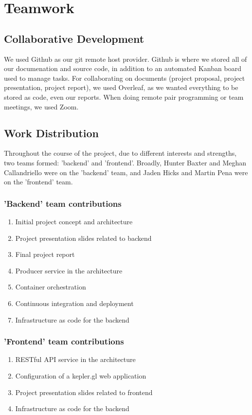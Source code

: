 \section{Teamwork}
\subsection{Collaborative Development}
We used Github as our git remote host provider.
Github is where we stored all of our documenation and source code, in addition to an automated Kanban board used to manage tasks.
For collaborating on documents (project proposal, project presentation, project report), we used Overleaf, as we wanted everything to be stored as code, even our reports.
When doing remote pair programming or team meetings, we used Zoom.

\subsection{Work Distribution}
Throughout the course of the project, due to different interests and strengths, two teams formed: 'backend' and 'frontend'.
Broadly, Hunter Baxter and Meghan Callandriello were on the 'backend' team, and Jaden Hicks and Martin Pena were on the 'frontend' team. 

\subsubsection{'Backend' team contributions}
\begin{enumerate}[i]
    \item Initial project concept and architecture
    \item Project presentation slides related to backend
    \item Final project report
    \item Producer service in the architecture
    \item Container orchestration
    \item Continuous integration and deployment
    \item Infrastructure as code for the backend
\end{enumerate}

\subsubsection{'Frontend' team contributions}
\begin{enumerate}[i]
    \item RESTful API service in the architecture
    \item Configuration of a kepler.gl web application
    \item Project presentation slides related to frontend
    \item Infrastructure as code for the backend
\end{enumerate}